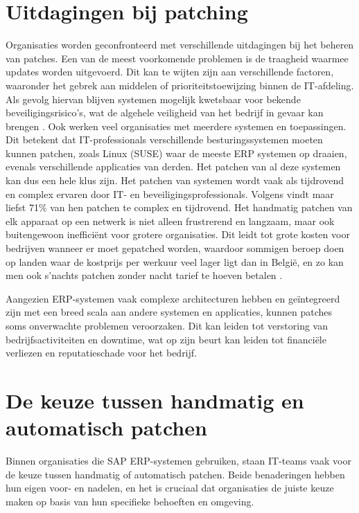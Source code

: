 \section{Uitdagingen bij patching}
Organisaties worden geconfronteerd met verschillende uitdagingen bij het beheren van patches. Een van de meest voorkomende problemen is de traagheid waarmee updates worden uitgevoerd. Dit kan te wijten zijn aan verschillende
factoren, waaronder het gebrek aan middelen of prioriteitstoewijzing binnen de IT-afdeling. Als gevolg hiervan blijven systemen mogelijk kwetsbaar
voor bekende beveiligingsrisico's, wat de algehele veiligheid van het bedrijf in gevaar kan brengen \autocite{AppMaster2023}. 
Ook werken veel organisaties met meerdere systemen en toepassingen. Dit betekent dat IT-professionals verschillende besturingssystemen moeten kunnen patchen, zoals Linux (SUSE) waar de meeste ERP systemen op draaien, evenals verschillende applicaties van derden.
Het patchen van al deze systemen kan dus een hele klus zijn. Het patchen van systemen wordt vaak als tijdrovend en complex ervaren door IT- en beveiligingsprofessionals. Volgens \textcite{ivanti2021} vindt maar liefst 71\% van hen patchen te complex en tijdrovend. Het handmatig patchen van elk apparaat op een netwerk is niet alleen frustrerend en langzaam, maar
ook buitengewoon inefficiënt voor grotere organisaties. Dit leidt tot grote kosten voor bedrijven wanneer er moet gepatched worden, waardoor sommigen beroep doen op landen waar de kostprijs per werkuur veel lager ligt dan in België, en zo kan men ook s'nachts patchen zonder nacht tarief te hoeven betalen \autocite{Munck2024}. 

Aangezien ERP-systemen vaak complexe architecturen hebben en geïntegreerd zijn met een breed scala aan andere systemen en applicaties, kunnen patches soms onverwachte problemen veroorzaken. Dit kan leiden tot verstoring van bedrijfsactiviteiten 
en downtime, wat op zijn beurt kan leiden tot financiële verliezen en reputatieschade voor het bedrijf.


\section{De keuze tussen handmatig en automatisch patchen}

Binnen organisaties die SAP ERP-systemen gebruiken, staan IT-teams vaak voor de keuze tussen handmatig of automatisch patchen. Beide benaderingen hebben hun eigen voor- en nadelen, en het is cruciaal dat organisaties de juiste keuze maken op basis van hun specifieke behoeften en omgeving.

